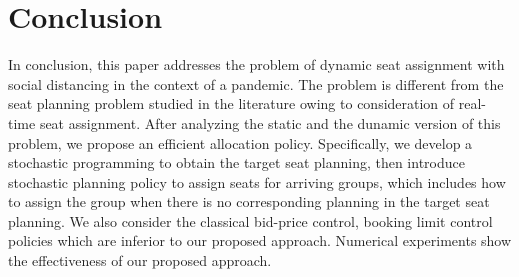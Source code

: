 \section{Conclusion}
In conclusion, this paper addresses the problem of dynamic seat assignment with social distancing in the context of a pandemic. The problem is different from the seat planning problem studied in the literature owing to consideration of real-time seat assignment. After analyzing the static and the dunamic version of this problem, we propose an efficient allocation policy. Specifically, we develop a stochastic programming to obtain the target seat planning, then introduce stochastic planning policy to assign seats for arriving groups, which includes how to assign the group when there is no corresponding planning in the target seat planning. We also consider the classical bid-price control, booking limit control policies which are inferior to our proposed approach. Numerical experiments show the effectiveness of our proposed approach.






